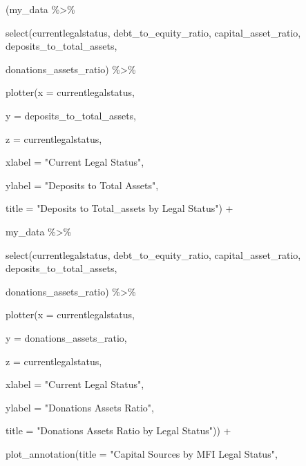 \documentclass[a4paper,nobind]{templates/ociamthesis}
\newenvironment{Shaded}{\begin{snugshade}}{\end{snugshade}}
\newcommand{\AttributeTok}[1]{\textcolor[rgb]{0.77,0.63,0.00}{#1}}
\newcommand{\FunctionTok}[1]{\textcolor[rgb]{0.00,0.00,0.00}{#1}}
\newcommand{\NormalTok}[1]{#1}
\newcommand{\SpecialCharTok}[1]{\textcolor[rgb]{0.00,0.00,0.00}{#1}}
\newcommand{\StringTok}[1]{\textcolor[rgb]{0.31,0.60,0.02}{#1}}
\renewenvironment{Shaded}
{
  \vspace{10pt}%
  \begin{snugshade}%
}{%
  \end{snugshade}%
  \vspace{8pt}%
}
\begin{document}
\begin{landscape}
\begin{Shaded}
\begin{Highlighting}[]
\NormalTok{(my\_data }\SpecialCharTok{\%\textgreater{}\%} 
  
  \FunctionTok{select}\NormalTok{(currentlegalstatus, debt\_to\_equity\_ratio, capital\_asset\_ratio, deposits\_to\_total\_assets, }
         
\NormalTok{         donations\_assets\_ratio) }\SpecialCharTok{\%\textgreater{}\%} 
  
  \FunctionTok{plotter}\NormalTok{(}\AttributeTok{x =}\NormalTok{ currentlegalstatus, }
          
          \AttributeTok{y =}\NormalTok{ deposits\_to\_total\_assets, }
          
          \AttributeTok{z =}\NormalTok{ currentlegalstatus, }
          
          \AttributeTok{xlabel =} \StringTok{"Current Legal Status"}\NormalTok{, }
          
          \AttributeTok{ylabel =} \StringTok{"Deposits to Total Assets"}\NormalTok{, }
          
          \AttributeTok{title =} \StringTok{"Deposits to Total\_assets by Legal Status"}\NormalTok{) }\SpecialCharTok{+}

\NormalTok{my\_data }\SpecialCharTok{\%\textgreater{}\%} 
  
  \FunctionTok{select}\NormalTok{(currentlegalstatus, debt\_to\_equity\_ratio, capital\_asset\_ratio, deposits\_to\_total\_assets, }
         
\NormalTok{         donations\_assets\_ratio) }\SpecialCharTok{\%\textgreater{}\%} 
  
  \FunctionTok{plotter}\NormalTok{(}\AttributeTok{x =}\NormalTok{ currentlegalstatus, }
          
          \AttributeTok{y =}\NormalTok{ donations\_assets\_ratio, }
          
          \AttributeTok{z =}\NormalTok{ currentlegalstatus, }
          
          \AttributeTok{xlabel =} \StringTok{"Current Legal Status"}\NormalTok{, }
          
          \AttributeTok{ylabel =} \StringTok{"Donations Assets Ratio"}\NormalTok{, }
          
          \AttributeTok{title =} \StringTok{"Donations Assets Ratio by Legal Status"}\NormalTok{)) }\SpecialCharTok{+} 
  
  \FunctionTok{plot\_annotation}\NormalTok{(}\AttributeTok{title =} \StringTok{"Capital Sources by MFI Legal Status"}\NormalTok{, }
                  

\end{Highlighting}
\end{Shaded}
\end{landscape}
\end{document}
